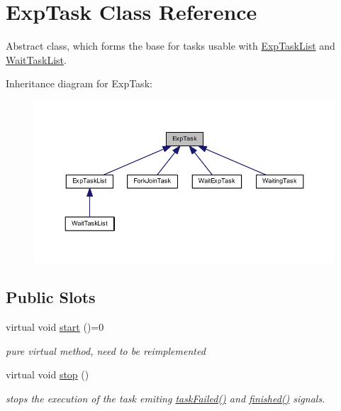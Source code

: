 \hypertarget{class_exp_task}{}\section{Exp\+Task Class Reference}
\label{class_exp_task}


Abstract class, which forms the base for tasks usable with \hyperlink{class_exp_task_list}{Exp\+Task\+List} and \hyperlink{class_wait_task_list}{Wait\+Task\+List}.  




Inheritance diagram for Exp\+Task\+:\nopagebreak
\begin{figure}[H]
\begin{center}
\leavevmode
\includegraphics[width=350pt]{class_exp_task__inherit__graph}
\end{center}
\end{figure}
\subsection*{Public Slots}
\begin{DoxyCompactItemize}
\item 
\hypertarget{class_exp_task_a58da730e303ed8dee404b9420e4099f3}{}virtual void \hyperlink{class_exp_task_a58da730e303ed8dee404b9420e4099f3}{start} ()=0\label{class_exp_task_a58da730e303ed8dee404b9420e4099f3}

\begin{DoxyCompactList}\small\item\em pure virtual method, need to be reimplemented \end{DoxyCompactList}\item 
\hypertarget{class_exp_task_a22f581786f11fa3c7dc52ff90c6b7043}{}virtual void \hyperlink{class_exp_task_a22f581786f11fa3c7dc52ff90c6b7043}{stop} ()\label{class_exp_task_a22f581786f11fa3c7dc52ff90c6b7043}

\begin{DoxyCompactList}\small\item\em stops the execution of the task emiting \hyperlink{class_exp_task_a1a766503f6eb22b82c6e31e279b0ea9d}{task\+Failed()} and \hyperlink{class_exp_task_aeb51d072a7b96f55da3738a8c7733611}{finished()} signals. \end{DoxyCompactList}\end{DoxyCompactItemize}
